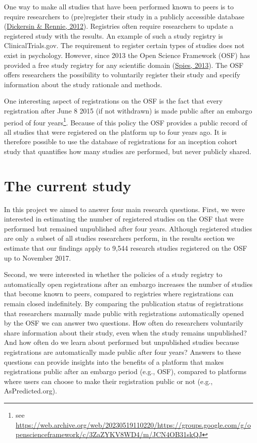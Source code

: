 \documentclass[
  ,jou, a4paper,floatsintext]{apa6}
\begin{document}
One way to make all studies that have been performed known to peers is to require researchers to (pre)register their study in a publicly accessible database (\protect\hyperlink{ref-dickersin_evolution_2012}{Dickersin \& Rennie, 2012}). Registries often require researchers to update a registered study with the results. An example of such a study registry is ClinicalTrials.gov. The requirement to register certain types of studies does not exist in psychology. However, since 2013 the Open Science Framework (OSF) has provided a free study registry for any scientific domain (\protect\hyperlink{ref-spies_open_2013}{Spies, 2013}). The OSF offers researchers the possibility to voluntarily register their study and specify information about the study rationale and methods.

One interesting aspect of registrations on the OSF is the fact that every registration after June 8 2015 (if not withdrawn) is made public after an embargo period of four years\footnote{see \url{https://web.archive.org/web/20230519110220/https://groups.google.com/g/openscienceframework/c/3ZaZYKV8WD4/m/JCN4OB31skQJ}}. Because of this policy the OSF provides a public record of all studies that were registered on the platform up to four years ago. It is therefore possible to use the database of registrations for an inception cohort study that quantifies how many studies are performed, but never publicly shared.

\hypertarget{the-current-study}{%
\section{The current study}\label{the-current-study}}

In this project we aimed to answer four main research questions. First, we were interested in estimating the number of registered studies on the OSF that were performed but remained unpublished after four years. Although registered studies are only a subset of all studies researchers perform, in the results section we estimate that our findings apply to 9,544 research studies registered on the OSF up to November 2017.

Second, we were interested in whether the policies of a study registry to automatically open registrations after an embargo increases the number of studies that become known to peers, compared to registries where registrations can remain closed indefinitely. By comparing the publication status of registrations that researchers manually made public with registrations automatically opened by the OSF we can answer two questions. How often do researchers voluntarily share information about their study, even when the study remains unpublished? And how often do we learn about performed but unpublished studies because registrations are automatically made public after four years? Answers to these questions can provide insights into the benefits of a platform that makes registrations public after an embargo period (e.g., OSF), compared to platforms where users can choose to make their registration public or not (e.g., AsPredicted.org).
\end{document}
